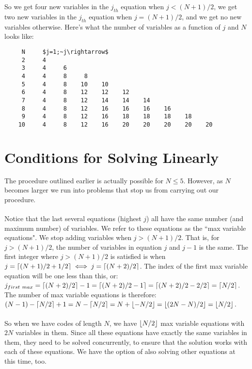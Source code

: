 \documentclass[a4paper]{article}
\DeclarePairedDelimiter{\ceil}{\lceil}{\rceil}
\DeclarePairedDelimiter\floor{\lfloor}{\rfloor}
\begin{document}
\\\\
So we get four new variables in the $j_{th}$ equation when $j < (N+1)/2$, we get two new variables in the $j_{th}$ equation when $j = (N+1)/2$, and we get no new variables otherwise. Here's what the number of variables as a function of $j$ and $N$ looks like:
\begin{lstlisting}
     N     $j=1;~j\rightarrow$
     2     4     
     3     4     6     
     4     4     8     8     
     5     4     8    10    10     
     6     4     8    12    12    12     
     7     4     8    12    14    14    14     
     8     4     8    12    16    16    16    16     
     9     4     8    12    16    18    18    18    18     
    10     4     8    12    16    20    20    20    20    20    
\end{lstlisting}
\clearpage
\section*{Conditions for Solving Linearly}
The procedure outlined earlier is actually possible for $N \leq 5$. However, as $N$ becomes larger we run into problems that stop us from carrying out our procedure.
\\\\
Notice that the last several equations (highest $j$) all have the same number (and maximum number) of variables. We refer to these equations as the ``max variable equations". We stop adding variables when $j > (N+1)/2$. That is, for $j > (N+1)/2$, the number of variables in equation $j$ and $j-1$ is the same. The first integer where $j > (N+1)/2$ is satisfied is when $j = \ceil{(N+1)/2 + 1/2} \iff j = \ceil{(N+2)/2}$. The index of the first max variable equation will be one less than this, or: $j_{first~max} = \ceil{(N+2)/2} - 1 = \ceil{(N+2)/2 - 1} = \ceil{(N+2)/2 - 2/2} = \ceil{N/2}$. The number of max variable equations is therefore: $(N-1) - \ceil{N/2} + 1 = N - \ceil{N/2} = N + \floor{-N/2} = \floor{(2N-N)/2} = \floor{N/2}$.
\\\\
So when we have codes of length $N$, we have $\floor{N/2}$ max variable equations with $2N$ variables in them. Since all these equations have exactly the same variables in them, they need to be solved concurrently, to ensure that the solution works with each of these equations. We have the option of also solving other equations at this time, too.
\end{document}
